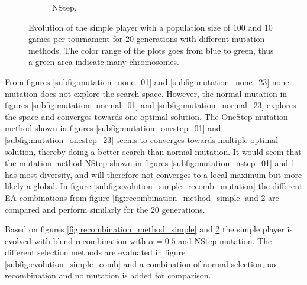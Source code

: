 \documentclass{llncs}
\begin{document}
\begin{figure}[t]
\begin{subfigure}[t]{0.24\textwidth}
        \caption{NStep.}
        \label{subfig:mutation_nstep_23}
    \end{subfigure}
    \caption{Evolution of the simple player with a population size of $100$ and $10$ games per tournament for $20$ generations with different mutation methods. The color range of the plots goes from blue to green, thus a green area indicate many chromosomes.}
    \label{fig:mutation_method_simple}
\end{figure}
From figures \ref{subfig:mutation_none_01} and \ref{subfig:mutation_none_23} none mutation does not explore the search space. However, the normal mutation in figures \ref{subfig:mutation_normal_01} and \ref{subfig:mutation_normal_23} explores the space and converges towards one optimal solution. The OneStep mutation method shown in figures \ref{subfig:mutation_onestep_01} and \ref{subfig:mutation_onestep_23} seems to converges towards multiple optimal solution, thereby doing a better search than normal mutation. It would seem that the mutation method NStep shown in figures \ref{subfig:mutation_nstep_01} and \ref{subfig:mutation_nstep_23} has most diversity, and will therefore not converges to a local maximum but more likely a global. In figure \ref{subfig:evolution_simple_recomb_mutation} the different EA combinations from figure \ref{fig:recombination_method_simple} and \ref{fig:mutation_method_simple} are compared and perform similarly for the $20$ generations.

Based on figures \ref{fig:recombination_method_simple} and \ref{fig:mutation_method_simple} the simple player is evolved with blend recombination with $\alpha=0.5$ and NStep mutation. The different selection methods are evaluated in figure \ref{subfig:evolution_simple_comb} and a combination of normal selection, no recombination and no mutation is added for comparison.
\end{document}
